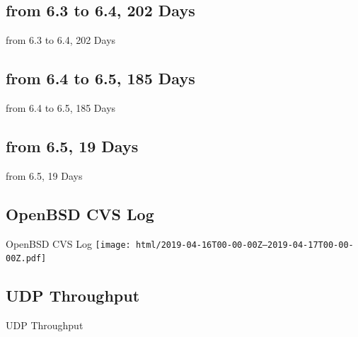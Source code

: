 \documentclass[14pt,aspectratio=169]{beamer}
\begin{document}
\subsection{from 6.3 to 6.4, 202 Days}
\begin{frame}{from 6.3 to 6.4, 202 Days}
    \begin{adjustbox}{totalheight=\baselineskip}
	
    \end{adjustbox}
\end{frame}

\subsection{from 6.4 to 6.5, 185 Days}
\begin{frame}{from 6.4 to 6.5, 185 Days}
    \begin{adjustbox}{totalheight=\baselineskip}
	
    \end{adjustbox}
\end{frame}

\subsection{from 6.5, 19 Days}
\begin{frame}{from 6.5, 19 Days}
    \begin{adjustbox}{totalheight=\baselineskip}
	
    \end{adjustbox}
\end{frame}

\subsection{OpenBSD CVS Log}
\begin{frame}{OpenBSD CVS Log}
    \texttt{[image: html/2019-04-16T00-00-00Z--2019-04-17T00-00-00Z.pdf]}
\end{frame}

\subsection{UDP Throughput}
\begin{frame}{UDP Throughput}
    \begin{adjustbox}{totalheight=\baselineskip}
	
    \end{adjustbox}
\end{frame}
\end{document}
